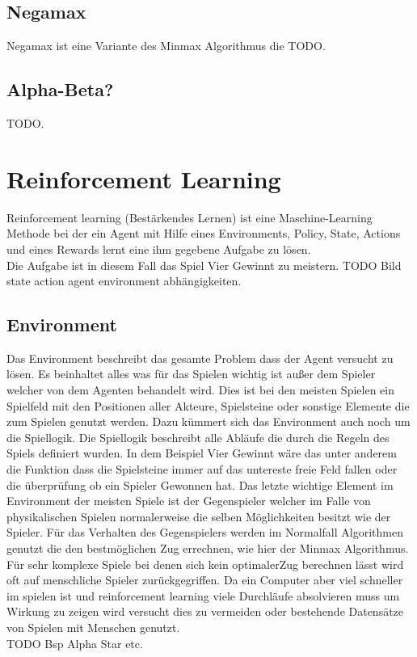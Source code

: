 \subsection{Negamax}
Negamax ist eine Variante des Minmax Algorithmus die \colorbox{red!30}{TODO}.

\subsection{Alpha-Beta?}
\colorbox{red!30}{TODO}.

\section{Reinforcement Learning}
Reinforcement learning (Bestärkendes Lernen) ist eine Maschine-Learning Methode bei der ein Agent mit Hilfe eines Environments, Policy, State, Actions und eines Rewards lernt eine ihm gegebene Aufgabe zu lösen. \\
Die Aufgabe ist in diesem Fall das Spiel Vier Gewinnt zu meistern.
\colorbox{red!30}{TODO Bild state action agent environment abhängigkeiten}.

\subsection{Environment}
Das Environment beschreibt das gesamte Problem dass der Agent versucht zu lösen. Es beinhaltet alles was für das Spielen wichtig ist außer dem Spieler welcher von dem Agenten behandelt wird.  Dies ist bei den meisten Spielen ein Spielfeld mit den Positionen aller Akteure, Spielsteine oder sonstige Elemente die zum Spielen genutzt werden. Dazu kümmert sich das Environment auch noch um die Spiellogik. Die Spiellogik beschreibt alle Abläufe die durch die Regeln des Spiels definiert wurden. In dem Beispiel Vier Gewinnt wäre das unter anderem die Funktion dass die Spielsteine immer auf das untereste freie Feld fallen oder die überprüfung ob ein Spieler Gewonnen hat. Das letzte wichtige Element im Environment der meisten Spiele ist der Gegenspieler welcher im Falle von physikalischen Spielen normalerweise die selben Möglichkeiten besitzt wie der Spieler. Für das Verhalten des Gegenspielers werden im Normalfall Algorithmen genutzt die den bestmöglichen Zug errechnen, wie hier der Minmax Algorithmus. Für sehr komplexe Spiele bei denen sich kein optimalerZug berechnen lässt wird oft auf menschliche Spieler zurückgegriffen. Da ein Computer aber viel schneller im spielen ist und reinforcement learning viele Durchläufe absolvieren muss um Wirkung zu zeigen wird versucht dies zu vermeiden oder bestehende Datensätze von Spielen mit Menschen genutzt.\\
 \colorbox{red!30}{TODO Bsp Alpha Star etc}.


